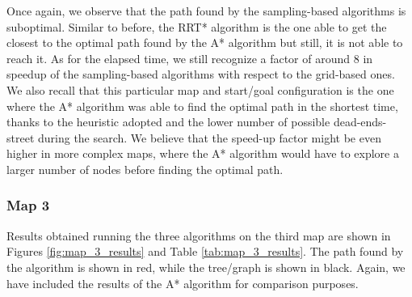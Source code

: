 Once again, we observe that the path found by the sampling-based algorithms is suboptimal.
Similar to before, the RRT* algorithm is the one able to get the closest to the optimal path found by the A* algorithm but still, it is not able to reach it.
As for the elapsed time, we still recognize a factor of around $8$ in speedup of the sampling-based algorithms with respect to the grid-based ones.
We also recall that this particular map and start/goal configuration is the one where the A* algorithm was able to find the optimal path in the shortest time, thanks to the heuristic adopted and the lower number of possible dead-ends-street during the search.
We believe that the speed-up factor might be even higher in more complex maps, where the A* algorithm would have to explore a larger number of nodes before finding the optimal path.


\subsubsection{Map 3}
\label{subsec:map_3}

Results obtained running the three algorithms on the third map are shown in Figures \ref{fig:map_3_results} and Table \ref{tab:map_3_results}.
The path found by the algorithm is shown in red, while the tree/graph is shown in black.
Again, we have included the results of the A* algorithm for comparison purposes.

